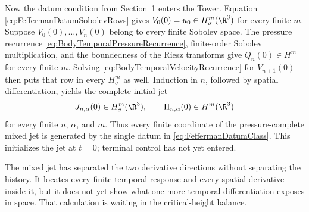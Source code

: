 Now the datum condition from Section~1 enters the Tower.
Equation \eqref{eq:FeffermanDatumSobolevRows} gives
\(V_0(0)=u_0\in H_\sigma^m(\R^3)\) for every finite \(m\).
Suppose \(V_0(0),\ldots,V_n(0)\) belong to every finite Sobolev space.
The pressure recurrence \eqref{eq:BodyTemporalPressureRecurrence}, finite-order
Sobolev multiplication, and the boundedness of the Riesz transforms give
\(Q_n(0)\in H^m\) for every finite \(m\).  Solving
\eqref{eq:BodyTemporalVelocityRecurrence} for \(V_{n+1}(0)\) then puts that
row in every \(H_\sigma^m\) as well.  Induction in \(n\), followed by spatial
differentiation, yields the complete initial jet
\begin{equation}\label{eq:BodyInitialPressureCompleteMixedJet}
  J_{n,\alpha}(0)\in H_\sigma^m(\R^3),
  \qquad
  \Pi_{n,\alpha}(0)\in H^m(\R^3)
\end{equation}
for every finite \(n\), \(\alpha\), and \(m\).  Thus every finite coordinate of
the pressure-complete mixed jet is generated by the single datum in
\eqref{eq:FeffermanDatumClass}.  This initializes the jet at \(t=0\); terminal
control has not yet entered.

The mixed jet has separated the two derivative directions without separating the history.
It locates every finite temporal response and every spatial derivative inside it, but it does not yet show what one more temporal differentiation exposes in space.
That calculation is waiting in the critical-height balance.
